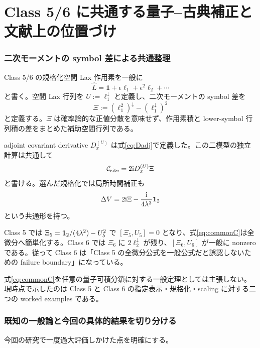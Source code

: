 \part{Class 5/6 に共通する量子--古典補正と文献上の位置づけ}

\section{二次モーメントの symbol 差による共通整理}
Class 5/6 の規格化空間 Lax 作用素を一般に
\begin{equation}
\widehat L=\mathbf 1+\epsilon\ell_1+\epsilon^2\ell_2+\cdots
\end{equation}
と書く。空間 Lax 行列を $U:=\ell_1^\downarrow$ と定義し、二次モーメントの symbol 差を
\begin{equation}
\Xi:=(\ell_1^2)^\downarrow-(\ell_1^\downarrow)^2
\label{eq:XiCommon}
\end{equation}
と定義する。$\Xi$ は確率論的な正値分散を意味せず、作用素積と lower-symbol 行列積の差をまとめた補助空間行列である。

adjoint covariant derivative $D_x^{(U)}$ は式\eqref{eq:Dadj}で定義した。この二模型の独立計算は共通して
\begin{equation}
\mathcal C_{\rm site}=2\mathrm i D_x^{(U)}\Xi
\label{eq:commonC}
\end{equation}
と書ける。選んだ規格化では局所時間補正も
\begin{equation}
\Delta V=2\mathrm i\Xi-\frac{\mathrm i}{4\lambda^2}\mathbf 1_{2}
\label{eq:commonDelta}
\end{equation}
という共通形を持つ。

Class 5 では $\Xi_5=\mathbf 1_{2}/(4\lambda^2)-U_5^2$ で $[\Xi_5,U_5]=0$ となり、式\eqref{eq:commonC}は全微分へ簡単化する。Class 6 では $\Xi_6$ に $2\ell_2^\downarrow$ が残り、$[\Xi_6,U_6]$ が一般に nonzero である。従って Class 6 は「Class 5 の全微分公式を一般公式だと誤認しないための failure boundary」になっている。

\begin{cautionnote}
式\eqref{eq:commonC}を任意の量子可積分鎖に対する一般定理としては主張しない。現時点で示したのは Class 5 と Class 6 の指定表示・規格化・scaling に対する二つの worked examples である。
\end{cautionnote}

\section{既知の一般論と今回の具体的結果を切り分ける}
今回の研究で一度過大評価しかけた点を明確にする。

